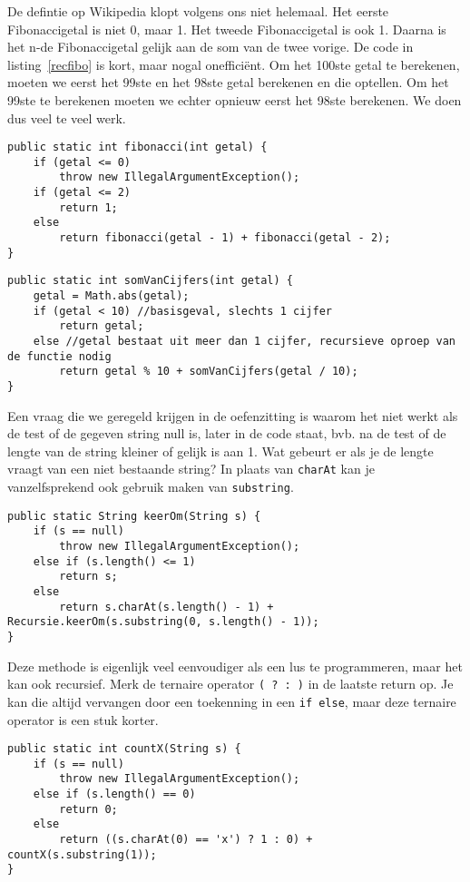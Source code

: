 \begin{Oplossing}{1.1}
De defintie op Wikipedia klopt volgens ons niet helemaal. Het eerste Fibonaccigetal is niet 0, maar 1. Het tweede Fibonaccigetal is ook 1. Daarna is het n-de Fibonaccigetal gelijk aan de som van de twee vorige. De code in listing~\ref{recfibo} is kort, maar nogal onefficiënt. Om het 100ste getal te berekenen, moeten we eerst het 99ste en het 98ste getal berekenen en die optellen. Om het 99ste te berekenen moeten we echter opnieuw eerst het 98ste berekenen. We doen dus veel te veel werk.
\begin{lstlisting}[caption={Recursieve methode om Fibonacci-getallen te berekenen}, label=recfibo]
public static int fibonacci(int getal) {
	if (getal <= 0)
		throw new IllegalArgumentException();
	if (getal <= 2)
		return 1;
	else
		return fibonacci(getal - 1) + fibonacci(getal - 2);
}
\end{lstlisting}
\end{Oplossing}
\begin{Oplossing}{1.2}
\begin{lstlisting}[caption={Recursieve methode om de som van de cijfers van een getal te berekenen}, label=recsomgetallen]
public static int somVanCijfers(int getal) {
	getal = Math.abs(getal);
	if (getal < 10) //basisgeval, slechts 1 cijfer
		return getal;
	else //getal bestaat uit meer dan 1 cijfer, recursieve oproep van de functie nodig
		return getal % 10 + somVanCijfers(getal / 10);
}
\end{lstlisting}
\end{Oplossing}
\begin{Oplossing}{1.3}
Een vraag die we geregeld krijgen in de oefenzitting is waarom het niet werkt als de test of de gegeven string null is, later in de code staat, bvb. na de test of de lengte van de string kleiner of gelijk is aan 1. Wat gebeurt er als je de lengte vraagt van een niet bestaande string? In plaats van \verb+charAt+ kan je vanzelfsprekend ook gebruik maken van \verb+substring+.
\begin{lstlisting}[caption={Recursieve methode om een string om te keren}, label=reckeerom]
public static String keerOm(String s) {
	if (s == null)
		throw new IllegalArgumentException();
	else if (s.length() <= 1)
		return s;
	else
		return s.charAt(s.length() - 1) + Recursie.keerOm(s.substring(0, s.length() - 1));
}
\end{lstlisting}
\end{Oplossing}
\begin{Oplossing}{1.4}
Deze methode is eigenlijk veel eenvoudiger als een lus te programmeren, maar het kan ook recursief. Merk de ternaire operator \verb+( ? : )+ in de laatste return op. Je kan die altijd vervangen door een toekenning in een \verb+if else+, maar deze ternaire operator is een stuk korter.
\begin{lstlisting}[caption={Recursieve methode om het aantal keer te tellen dat de letter x in een string voorkomt}, label=reccountx]
public static int countX(String s) {
	if (s == null)
		throw new IllegalArgumentException();
	else if (s.length() == 0)
		return 0;
	else
		return ((s.charAt(0) == 'x') ? 1 : 0) + countX(s.substring(1));
}
\end{lstlisting}

\end{Oplossing}
